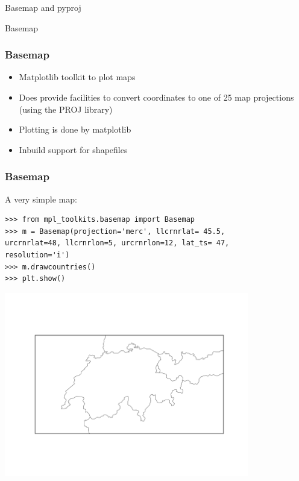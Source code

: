\begin{frame}
\begin{center}
\Huge{Basemap and pyproj}
\end{center}
\end{frame}

\begin{frame}
\begin{center}
\Huge{Basemap}
\end{center}
\end{frame}

\begin{frame}
\frametitle{Basemap}
\begin{itemize}
  \item Matplotlib toolkit to plot maps
  \item Does provide facilities to convert coordinates to one of 25 map
  projections (using the PROJ library)
  \item Plotting is done by matplotlib
  \item Inbuild support for shapefiles
\end{itemize}
\end{frame}

\begin{frame}[fragile]
\frametitle{Basemap}
A very simple map:
\begin{myColorBox}{0.9}{}
\begin{verbatim}
>>> from mpl_toolkits.basemap import Basemap
>>> m = Basemap(projection='merc', llcrnrlat= 45.5, 
urcrnrlat=48, llcrnrlon=5, urcrnrlon=12, lat_ts= 47, 
resolution='i')
>>> m.drawcountries()
>>> plt.show()
\end{verbatim}
\end{myColorBox}
\pause
\begin{center}
      \includegraphics[width=0.8\textwidth]{pix/basemap_example_1}
\end{center}
\end{frame}

